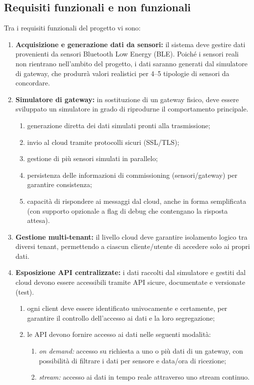 \documentclass[a4paper,11pt]{article}
\begin{document}
\subsection{Requisiti funzionali e non funzionali}
Tra i requisiti funzionali del progetto vi sono:
\begin{enumerate}[noitemsep, topsep=0pt]
  \item \textbf{Acquisizione e generazione dati da sensori:} il sistema deve gestire dati provenienti da sensori Bluetooth Low Energy (BLE). 
  Poiché i sensori reali non rientrano nell'ambito del progetto, i dati saranno generati dal simulatore di gateway, 
  che produrrà valori realistici per 4--5 tipologie di sensori da concordare.

  \item \textbf{Simulatore di gateway:} in sostituzione di un gateway fisico, deve essere sviluppato un simulatore 
  in grado di riprodurne il comportamento principale.
  \begin{enumerate}
    \item generazione diretta dei dati simulati pronti alla trasmissione;
    \item invio al cloud tramite protocolli sicuri (SSL/TLS);
    \item gestione di più sensori simulati in parallelo;
    \item persistenza delle informazioni di commissioning (sensori/gateway) per garantire consistenza;
    \item capacità di rispondere ai messaggi dal cloud, anche in forma semplificata 
    (con supporto opzionale a flag di debug che contengano la risposta attesa).
  \end{enumerate}

  \item \textbf{Gestione multi-tenant:} il livello cloud deve garantire isolamento logico tra diversi tenant, 
  permettendo a ciascun cliente/utente di accedere solo ai propri dati.

  \item \textbf{Esposizione API centralizzate:} i dati raccolti dal simulatore e gestiti dal cloud devono essere accessibili 
  tramite API sicure, documentate e versionate (test).
  \begin{enumerate}
    \item ogni client deve essere identificato univocamente e certamente, per garantire il controllo 
    dell’accesso ai dati e la loro segregazione;
    \item le API devono fornire accesso ai dati nelle seguenti modalità:
    \begin{enumerate}
      \item \textit{on demand:} accesso su richiesta a uno o più dati di un gateway, 
      con possibilità di filtrare i dati per sensore e data/ora di ricezione;
      \item \textit{stream:} accesso ai dati in tempo reale attraverso uno stream continuo.
    \end{enumerate}
  \end{enumerate}


\end{enumerate}
\end{document}
